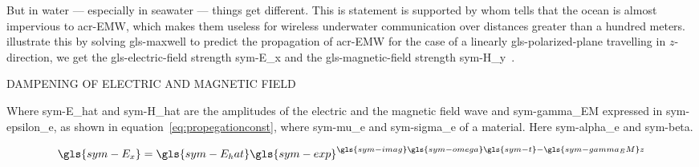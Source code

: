 But in water --- especially in seawater --- things get different. This is statement is supported by 
\citet{ramakrishna_next_2012} whom tells that the ocean is almost impervious to \gls{acr-EMW}, which makes them 
useless for wireless underwater communication over distances greater than a hundred meters.
\citet{hagman_elias_design_2009} illustrate this by solving \gls{gls-maxwell} to predict the propagation of 
\gls{acr-EMW} for the case of a linearly \gls{gls-polarized-plane} travelling in \(z\)-direction,
we get the \gls{gls-electric-field} strength \gls{sym-E_x}  and the \gls{gls-magnetic-field} strength 
\gls{sym-H_y}~\cite{hagman_elias_design_2009}.

\begin{RoyalFigure}[!htb, label=fig:elecmagdamp]{DAMPENING OF ELECTRIC AND MAGNETIC FIELD}
\end{RoyalFigure}

Where \gls{sym-E_hat}  and \gls{sym-H_hat} are the amplitudes of the electric and the magnetic field wave and 
\gls{sym-gamma_EM} expressed in \gls{sym-epsilon_e}, as shown in equation~\ref{eq:propegationconst},
where \gls{sym-mu_e} and \gls{sym-sigma_e} of a material. Here \gls{sym-alpha_e} and \gls{sym-beta}.

\begin{equation}
    \label{eq:MaxwellE}
    \gls{sym-E_x} = \gls{sym-E_hat} \gls{sym-exp}^{\gls{sym-imag}  \gls{sym-omega}  \gls{sym-t}  - \gls{sym-gamma_EM}
    z}
\end{equation}

